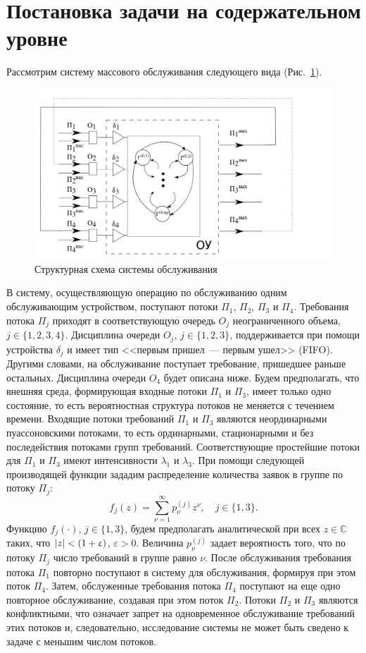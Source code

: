 \section{Постановка задачи на содержательном уровне}
Рассмотрим систему массового обслуживания следующего вида (Рис.~\ref{SystemScheme}).
\begin{figure}[h]
\includegraphics[scale=0.45]{Pictures/SystemScheme.png} 
\caption{Структурная схема системы обслуживания}
\label{SystemScheme}
\end{figure}
В систему,  осуществляющую операцию по обслуживанию одним обслуживающим устройством,  поступают потоки $\Pi_1$,  $\Pi_2$,  $\Pi_3$  и $\Pi_4$. Требования потока $\Pi_j$ приходят в соответствующую очередь $O_j$ неограниченного объема,  $j\in \{1,  2,  3,  4\}$. Дисциплина очереди $O_j$,  $j \in \{1,  2,  3\}$,  поддерживается при помощи устройства $\delta_j$ и имеет тип <<первым пришел~--- первым ушел>> (FIFO). Другими словами,  на обслуживание поступает требование,  пришедшее раньше остальных. Дисциплина очереди $O_4$ будет описана ниже. Будем предполагать,  что внешняя среда,  формирующая входные потоки $\Pi_1$ и $\Pi_3$,  имеет только одно состояние,  то есть вероятностная структура потоков не меняется с течением времени. 
Входящие потоки требований $\Pi_1$ и $\Pi_3$ являются неординарными пуассоновскими потоками,  то есть ординарными,  стационарными и без последействия потоками групп требований. Соответствующие простейшие потоки для $\Pi_1$ и $\Pi_3$ имеют интенсивности $\lambda_1$ и $\lambda_3$. При помощи следующей производящей функции зададим  распределение количества заявок в группе по потоку $\Pi_j$:
\begin{equation}
f_j(z) = \sum_{\nu=1}^{\infty} p_{\nu}^{(j)} z^{\nu},  \quad j\in \{1, 3\}.
\label{GeneratingFunc}
\end{equation}
Функцию $f_j(\cdot)$,  $j\in \{1, 3\}$,  будем предполагать аналитической при всех $z\in \mathbb{C}$ таких,  что $|z|\hm<(1+\varepsilon)$,  $\varepsilon>0$. Величина $p_{\nu}^{(j)}$ задает  вероятность того,  что по потоку $\Pi_j$ число требований в группе равно $\nu$. После обслуживания требования потока $\Pi_1$ повторно поступают в систему для обслуживания,  формируя при этом поток $\Pi_4$. Затем,  обслуженные требования потока $\Pi_4$ поступают на еще одно повторное обслуживание,  создавая при этом поток $\Pi_2$. Потоки $\Pi_2$ и $\Pi_3$ являются конфликтными,  что означает запрет на одновременное обслуживание требований этих потоков и,  следовательно,  исследование системы не может быть сведено к задаче с меньшим числом потоков. 

